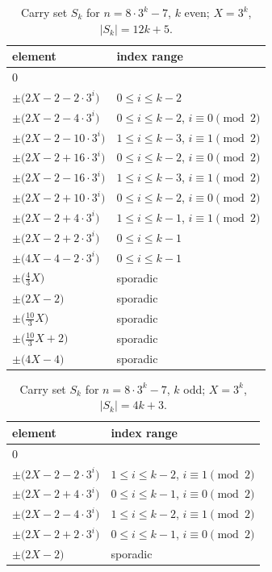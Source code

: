 \begin{table}[htbp]\centering\small
\caption{Carry set $S_k$ for $n=8\cdot 3^k - 7$, $k$ even; $X=3^k$, $|S_k|=12k+5$.}
\label{tab:8m70}
\begin{tabular}{ll}\toprule
element & index range \\ \midrule
$0$ & \\
$\pm\bigl(2X - 2 - 2\cdot 3^i\bigr)$ & $0\le i\le k-2$ \\
$\pm\bigl(2X - 2 - 4\cdot 3^i\bigr)$ & $0\le i\le k-2$, $i\equiv 0\pmod 2$ \\
$\pm\bigl(2X - 2 - 10\cdot 3^i\bigr)$ & $1\le i\le k-3$, $i\equiv 1\pmod 2$ \\
$\pm\bigl(2X - 2 + 16\cdot 3^i\bigr)$ & $0\le i\le k-2$, $i\equiv 0\pmod 2$ \\
$\pm\bigl(2X - 2 - 16\cdot 3^i\bigr)$ & $1\le i\le k-3$, $i\equiv 1\pmod 2$ \\
$\pm\bigl(2X - 2 + 10\cdot 3^i\bigr)$ & $0\le i\le k-2$, $i\equiv 0\pmod 2$ \\
$\pm\bigl(2X - 2 + 4\cdot 3^i\bigr)$ & $1\le i\le k-1$, $i\equiv 1\pmod 2$ \\
$\pm\bigl(2X - 2 + 2\cdot 3^i\bigr)$ & $0\le i\le k-1$ \\
$\pm\bigl(4X - 4 - 2\cdot 3^i\bigr)$ & $0\le i\le k-1$ \\
$\pm\bigl(\tfrac{4}{3}X\bigr)$ & sporadic \\
$\pm\bigl(2X - 2\bigr)$ & sporadic \\
$\pm\bigl(\tfrac{10}{3}X\bigr)$ & sporadic \\
$\pm\bigl(\tfrac{10}{3}X + 2\bigr)$ & sporadic \\
$\pm\bigl(4X - 4\bigr)$ & sporadic \\
\bottomrule\end{tabular}\end{table}

\begin{table}[htbp]\centering\small
\caption{Carry set $S_k$ for $n=8\cdot 3^k - 7$, $k$ odd; $X=3^k$, $|S_k|=4k+3$.}
\label{tab:8m71}
\begin{tabular}{ll}\toprule
element & index range \\ \midrule
$0$ & \\
$\pm\bigl(2X - 2 - 2\cdot 3^i\bigr)$ & $1\le i\le k-2$, $i\equiv 1\pmod 2$ \\
$\pm\bigl(2X - 2 + 4\cdot 3^i\bigr)$ & $0\le i\le k-1$, $i\equiv 0\pmod 2$ \\
$\pm\bigl(2X - 2 - 4\cdot 3^i\bigr)$ & $1\le i\le k-2$, $i\equiv 1\pmod 2$ \\
$\pm\bigl(2X - 2 + 2\cdot 3^i\bigr)$ & $0\le i\le k-1$, $i\equiv 0\pmod 2$ \\
$\pm\bigl(2X - 2\bigr)$ & sporadic \\
\bottomrule\end{tabular}\end{table}

